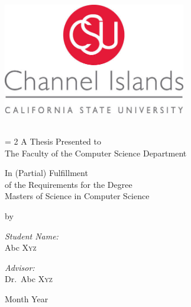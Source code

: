 \begin{titlepage}
\begin{center}
\includegraphics[width=0.60\textwidth]{media/correctlogo.jpg}~\\


\HRule \\[0.5cm]
{\Large \bfseries \thesistitle \par}

\vspace{0.5 cm}

\baselineskip = 2\baselineskip
A Thesis Presented to \\
The Faculty of the Computer Science Department

\vspace{0.5 cm}

In (Partial) Fulfillment\\
of the Requirements for the Degree\\
Masters of Science in Computer Science\\

\vspace{0.5 cm }


by \\

\begin{minipage}{0.4\textwidth}
\begin{flushleft} \small
\emph{Student Name:}\\
Abc \textsc{Xyz}
\end{flushleft}
\end{minipage}
\begin{minipage}{0.4\textwidth}
\begin{flushright} \small
\emph{Advisor:} \\
Dr.~Abc \textsc{Xyz}
\end{flushright}
\end{minipage}

Month Year\\
\HRule \\[1.0cm]
\end{center}
\end{titlepage}